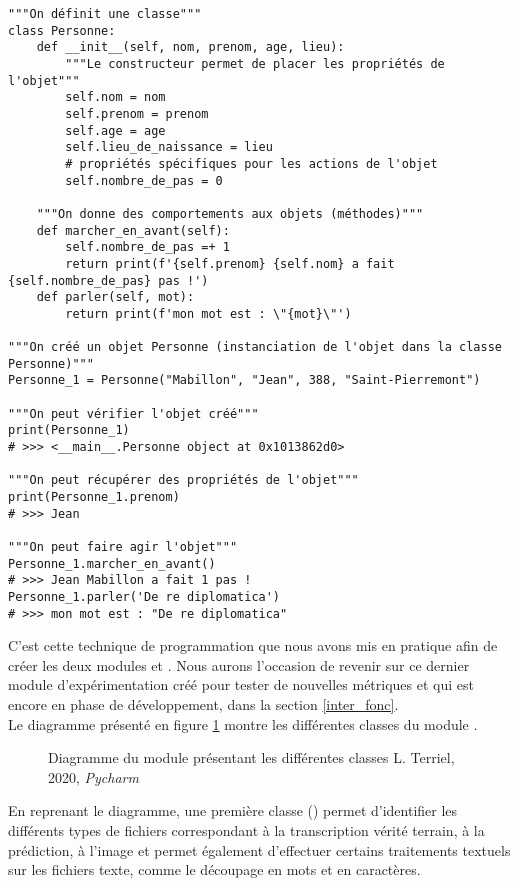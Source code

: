 \lstset{language=Python}
\begin{lstlisting}
"""On définit une classe"""
class Personne:
    def __init__(self, nom, prenom, age, lieu):
        """Le constructeur permet de placer les propriétés de l'objet"""
        self.nom = nom
        self.prenom = prenom
        self.age = age
        self.lieu_de_naissance = lieu
        # propriétés spécifiques pour les actions de l'objet
        self.nombre_de_pas = 0

    """On donne des comportements aux objets (méthodes)"""
    def marcher_en_avant(self):
        self.nombre_de_pas =+ 1
        return print(f'{self.prenom} {self.nom} a fait {self.nombre_de_pas} pas !')
    def parler(self, mot):
        return print(f'mon mot est : \"{mot}\"')

"""On créé un objet Personne (instanciation de l'objet dans la classe Personne)"""
Personne_1 = Personne("Mabillon", "Jean", 388, "Saint-Pierremont")

"""On peut vérifier l'objet créé"""
print(Personne_1)
# >>> <__main__.Personne object at 0x1013862d0>

"""On peut récupérer des propriétés de l'objet"""
print(Personne_1.prenom)
# >>> Jean

"""On peut faire agir l'objet"""
Personne_1.marcher_en_avant()
# >>> Jean Mabillon a fait 1 pas !
Personne_1.parler('De re diplomatica')
# >>> mon mot est : "De re diplomatica"
\end{lstlisting}

C'est cette technique de programmation que nous avons mis en pratique afin de créer les deux modules  et . Nous aurons l'occasion de revenir sur ce dernier module d'expérimentation créé pour tester de nouvelles métriques et qui est encore en phase de développement, dans la section \ref{inter_fonc}.\\

Le diagramme présenté en figure \ref{fig:diag_synsem} montre les différentes classes du module 
.

\begin{figure}[h!]
    \centering
    \centerline{}
    \caption{Diagramme du module  présentant les différentes classes \textcopyright L. Terriel, 2020, \textit{Pycharm}}
    \label{fig:diag_synsem}
\end{figure}

En reprenant le diagramme, une première classe () permet d'identifier les différents types de fichiers correspondant à la transcription vérité terrain, à la prédiction, à l'image et permet également d'effectuer certains traitements textuels sur les fichiers texte, comme le découpage en mots et en caractères. 

